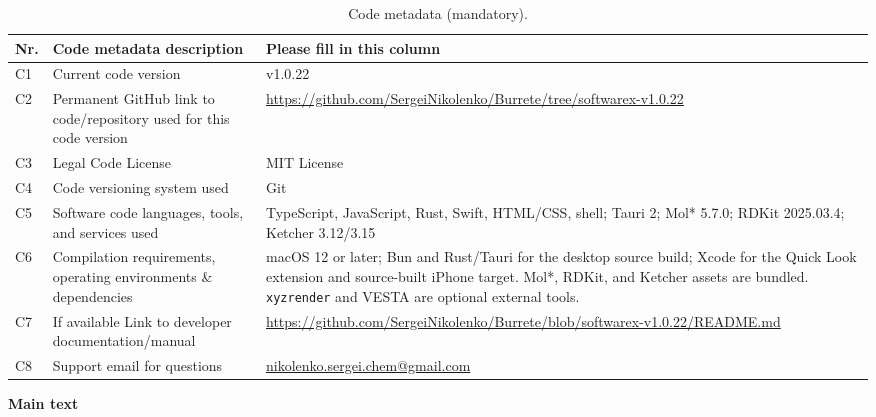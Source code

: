 \documentclass[preprint,12pt,a4paper]{elsarticle}
\begin{document}
\begin{table}[!ht]
\begin{tabular}{|l|p{5.85cm}|p{5.85cm}|}
\hline
\textbf{Nr.} & \textbf{Code metadata description} &
\textbf{Please fill in this column} \\
\hline
C1 & Current code version & v1.0.22 \\
\hline
C2 & Permanent GitHub link to code/repository used for this code version &
\url{https://github.com/SergeiNikolenko/Burrete/tree/softwarex-v1.0.22} \\
\hline
C3 & Legal Code License & MIT License \\
\hline
C4 & Code versioning system used & Git \\
\hline
C5 & Software code languages, tools, and services used &
TypeScript, JavaScript, Rust, Swift, HTML/CSS, shell; Tauri 2; Mol* 5.7.0;
RDKit 2025.03.4; Ketcher 3.12/3.15 \\
\hline
C6 & Compilation requirements, operating environments \& dependencies &
macOS 12 or later; Bun and Rust/Tauri for the desktop source build; Xcode for
the Quick Look extension and source-built iPhone target. Mol*, RDKit, and
Ketcher assets are bundled. \texttt{xyzrender} and VESTA are optional external
tools. \\
\hline
C7 & If available Link to developer documentation/manual &
\url{https://github.com/SergeiNikolenko/Burrete/blob/softwarex-v1.0.22/README.md} \\
\hline
C8 & Support email for questions & \url{nikolenko.sergei.chem@gmail.com} \\
\hline
\end{tabular}
\caption{Code metadata (mandatory).}
\label{tab:code-metadata}
\end{table}

\textbf{Main text}
\end{document}

